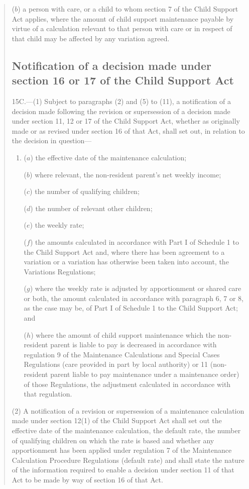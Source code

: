 \documentclass[12pt,a4paper]{article}
\begin{document}
\begin{quotation}
\begin{enumerate}
($b$) a person with care, or a child to whom section 7 of the Child Support Act applies, where the amount of child support maintenance payable by virtue of a calculation relevant to that person with care or in respect of that child may be affected by any variation agreed.
\end{enumerate}

\subsection*{Notification of a decision made under section 16 or 17 of the Child Support Act}

15C.---(1)  Subject to paragraphs (2) and (5) to (11), a notification of a decision made following the revision or supersession of a decision made under section 11, 12 or 17 of the Child Support Act, whether as originally made or as revised under section 16 of that Act, shall set out, in relation to the decision in question—
\begin{enumerate}\item[]
($a$) the effective date of the maintenance calculation;

($b$) where relevant, the non-resident parent’s net weekly income;

($c$) the number of qualifying children;

($d$) the number of relevant other children;

($e$) the weekly rate;

($f$) the amounts calculated in accordance with Part I of Schedule 1 to the Child Support Act and, where there has been agreement to a variation or a variation has otherwise been taken into account, the Variations Regulations;

($g$) where the weekly rate is adjusted by apportionment or shared care or both, the amount calculated in accordance with paragraph 6, 7 or 8, as the case may be, of Part I of Schedule 1 to the Child Support Act; and

($h$) where the amount of child support maintenance which the non-resident parent is liable to pay is decreased in accordance with regulation 9 of the Maintenance Calculations and Special Cases Regulations (care provided in part by local authority) or 11 (non-resident parent liable to pay maintenance under a maintenance order) of those Regulations, the adjustment calculated in accordance with that regulation.
\end{enumerate}

(2) A notification of a revision or supersession of a maintenance calculation made under section 12(1) of the Child Support Act shall set out the effective date of the maintenance calculation, the default rate, the number of qualifying children on which the rate is based and whether any apportionment has been applied under regulation 7 of the Maintenance Calculation Procedure Regulations (default rate) and shall state the nature of the information required to enable a decision under section 11 of that Act to be made by way of section 16 of that Act.


\end{quotation}
\end{document}
